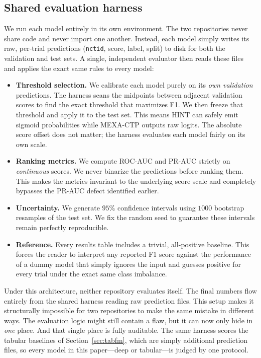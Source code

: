 \documentclass[a4paper,fleqn]{cas-sc}
\begin{document}
\subsection{Shared evaluation harness}
We run each model entirely in its own environment. The two repositories never share code and never import one another. Instead, each model simply writes its raw, per-trial predictions (\texttt{nctid}, score, label, split) to disk for both the validation and test sets. A single, independent evaluator then reads these files and applies the exact same rules to every model:
\begin{itemize}[leftmargin=1.4em,itemsep=1pt,topsep=2pt]
\item \textbf{Threshold selection.} We calibrate each model purely on its \emph{own validation} predictions. The harness scans the midpoints between adjacent validation scores to find the exact threshold that maximizes F1. We then freeze that threshold and apply it to the test set. This means HINT can safely emit sigmoid probabilities while MEXA-CTP outputs raw logits. The absolute score offset does not matter; the harness evaluates each model fairly on its own scale.
\item \textbf{Ranking metrics.} We compute ROC-AUC and PR-AUC strictly on \emph{continuous} scores. We never binarize the predictions before ranking them. This makes the metrics invariant to the underlying score scale and completely bypasses the PR-AUC defect identified earlier.
\item \textbf{Uncertainty.} We generate $95\%$ confidence intervals using $1000$ bootstrap resamples of the test set. We fix the random seed to guarantee these intervals remain perfectly reproducible.
\item \textbf{Reference.} Every results table includes a trivial, all-positive baseline. This forces the reader to interpret any reported F1 score against the performance of a dummy model that simply ignores the input and guesses positive for every trial under the exact same class imbalance.
\end{itemize}
Under this architecture, neither repository evaluates itself. The final numbers flow entirely from the shared harness reading raw prediction files. This setup makes it structurally impossible for two repositories to make the same mistake in different ways. The evaluation logic might still contain a flaw, but it can now only hide in \emph{one} place. And that single place is fully auditable. The same harness scores the tabular baselines of Section~\ref{sec:tabfm}, which are simply additional prediction files, so every model in this paper---deep or tabular---is judged by one protocol.
\end{document}
